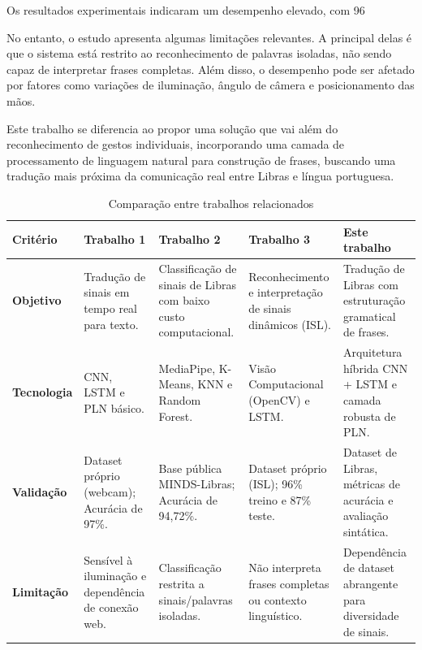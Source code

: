 \documentclass[
    12pt,                %
    openright,           %
    oneside,             %
    a4paper,             %
    english,             %
    brazil               %
]{abntex2}
\begin{document}
Os resultados experimentais indicaram um desempenho elevado, com 96%

No entanto, o estudo apresenta algumas limitações relevantes. A principal delas é que o sistema está restrito ao reconhecimento de palavras isoladas, não sendo capaz de interpretar frases completas. Além disso, o desempenho pode ser afetado por fatores como variações de iluminação, ângulo de câmera e posicionamento das mãos.

Este trabalho se diferencia ao propor uma solução que vai além do reconhecimento de gestos individuais, incorporando uma camada de processamento de linguagem natural para construção de frases, buscando uma tradução mais próxima da comunicação real entre Libras e língua portuguesa.

\vspace{0.5cm}

\begin{table}[htb]
    \centering
    \caption{Comparação entre trabalhos relacionados}
    \label{tab:trabalhos_relacionados}
    \small %
    \begin{tabular}{p{2cm}|p{3cm}|p{3cm}|p{3cm}|p{3cm}}
        \toprule
        \textbf{Critério} & \textbf{Trabalho 1} & \textbf{Trabalho 2} & \textbf{Trabalho 3} & \textbf{Este trabalho} \\
        \midrule
        \textbf{Objetivo} 
        & Tradução de sinais em tempo real para texto. 
        & Classificação de sinais de Libras com baixo custo computacional. 
        & Reconhecimento e interpretação de sinais dinâmicos (ISL). 
        & Tradução de Libras com estruturação gramatical de frases. \\
        \midrule
        \textbf{Tecnologia} 
        & CNN, LSTM e PLN básico. 
        & MediaPipe, K-Means, KNN e Random Forest. 
        & Visão Computacional (OpenCV) e LSTM. 
        & Arquitetura híbrida CNN + LSTM e camada robusta de PLN. \\
        \midrule
        \textbf{Validação} 
        & Dataset próprio (webcam); Acurácia de 97\%. 
        & Base pública MINDS-Libras; Acurácia de 94,72\%. 
        & Dataset próprio (ISL); 96\% treino e 87\% teste. 
        & Dataset de Libras, métricas de acurácia e avaliação sintática. \\
        \midrule
        \textbf{Limitação} 
        & Sensível à iluminação e dependência de conexão web. 
        & Classificação restrita a sinais/palavras isoladas. 
        & Não interpreta frases completas ou contexto linguístico. 
        & Dependência de dataset abrangente para diversidade de sinais. \\
        \bottomrule
    \end{tabular}
    \\
\end{table}
\end{document}
